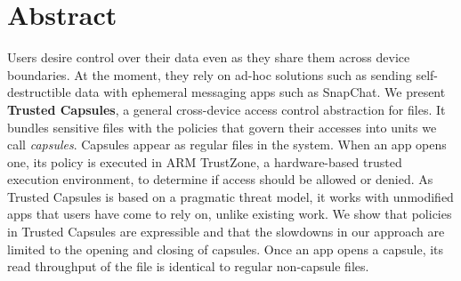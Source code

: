 
\chapter{Abstract}

Users desire control over their data even as they share them across device
  boundaries. At the moment, they rely on ad-hoc solutions such as sending
  self-destructible data with ephemeral messaging apps such as SnapChat. We 
  present \textbf{Trusted Capsules}, a general cross-device access
  control abstraction for files. It bundles sensitive files with the policies
  that govern their accesses into units we call {\em capsules}. Capsules appear
  as regular files in the system. When an app opens one, its policy is executed
  in ARM TrustZone, a hardware-based trusted execution environment, to determine
  if access should be allowed or denied. As Trusted Capsules is based on a
  pragmatic threat model, it works with unmodified apps that users have come to
  rely on, unlike existing work. We show that policies in Trusted Capsules are
  expressible and that the slowdowns in our approach are limited to the opening
  and closing of capsules. Once an app opens a capsule, its read throughput of
  the file is identical to regular non-capsule files.


